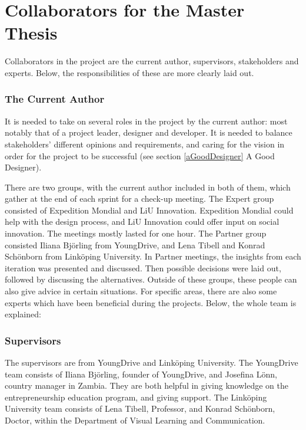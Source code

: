 \section{Collaborators for the Master Thesis}\label{sec:collaborators}

Collaborators in the project are the current author, supervisors, stakeholders and experts. Below, the responsibilities of these are more clearly laid out.

\subsubsection{The Current Author}
It is needed to take on several roles in the project by the current author: most notably that of a project leader, designer and developer. It is needed to balance stakeholders' different opinions and requirements, and caring for the vision in order for the project to be successful (see section \ref{aGoodDesigner} A Good Designer).

There are two groups, with the current author included in both of them, which gather at the end of each sprint for a check-up meeting. The Expert group consisted of Expedition Mondial and LiU Innovation. Expedition Mondial could help with the design process, and LiU Innovation could offer input on social innovation. The meetings mostly lasted for one hour. The Partner group consisted Iliana Björling from YoungDrive, and Lena Tibell and Konrad Schönborn from Linköping University. In Partner meetings, the insights from each iteration was presented and discussed. Then possible decisions were laid out, followed by discussing the alternatives. Outside of these groups, these people can also give advice in certain situations. For specific areas, there are also some experts which have been beneficial during the projects. Below, the whole team is explained: %

\subsubsection{Supervisors}
The supervisors are from YoungDrive and Linköping University. The YoungDrive team consists of Iliana Björling, founder of YoungDrive, and Josefina Lönn, country manager in Zambia. They are both helpful in giving knowledge on the entrepreneurship education program, and giving support. The Linköping University team consists of Lena Tibell, Professor, and Konrad Schönborn, Doctor, within the Department of Visual Learning and Communication.

